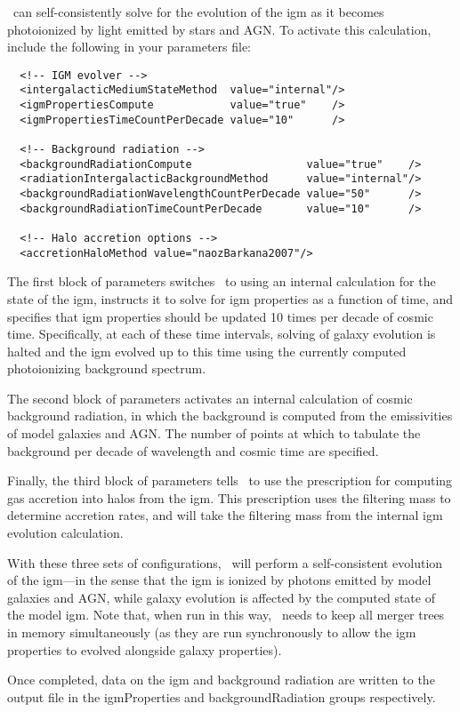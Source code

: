 \glc\ can self-consistently solve for the evolution of the \gls{igm} as it becomes photoionized by light emitted by stars and AGN. To activate this calculation, include the following in your parameters file:
\begin{verbatim}
  <!-- IGM evolver -->
  <intergalacticMediumStateMethod  value="internal"/>
  <igmPropertiesCompute            value="true"    />
  <igmPropertiesTimeCountPerDecade value="10"      />
  
  <!-- Background radiation -->
  <backgroundRadiationCompute                  value="true"    />
  <radiationIntergalacticBackgroundMethod      value="internal"/>
  <backgroundRadiationWavelengthCountPerDecade value="50"      />
  <backgroundRadiationTimeCountPerDecade       value="10"      />

  <!-- Halo accretion options -->
  <accretionHaloMethod value="naozBarkana2007"/>
\end{verbatim}
The first block of parameters switches \glc\ to using an internal calculation for the state of the \gls{igm}, instructs it to solve for \gls{igm} properties as a function of time, and specifies that \gls{igm} properties should be updated 10 times per decade of cosmic time. Specifically, at each of these time intervals, solving of galaxy evolution is halted and the \gls{igm} evolved up to this time using the currently computed photoionizing background spectrum.

The second block of parameters activates an internal calculation of cosmic background radiation, in which the background is computed from the emissivities of model galaxies and AGN. The number of points at which to tabulate the background per decade of wavelength and cosmic time are specified.

Finally, the third block of parameters tells \glc\ to use the \cite{naoz_formation_2007} prescription for computing gas accretion into halos from the \gls{igm}. This prescription uses the filtering mass to determine accretion rates, and will take the filtering mass from the internal \gls{igm} evolution calculation.

With these three sets of configurations, \glc\ will perform a self-consistent evolution of the \gls{igm}---in the sense that the \gls{igm} is ionized by photons emitted by model galaxies and AGN, while galaxy evolution is affected by the computed state of the model \gls{igm}. Note that, when run in this way, \glc\ needs to keep all merger trees in memory simultaneously (as they are run synchronously to allow the \gls{igm} properties to evolved alongside galaxy properties).

Once completed, data on the \gls{igm} and background radiation are written to the output file in the {\normalfont \ttfamily igmProperties} and {\normalfont \ttfamily backgroundRadiation} groups respectively.
